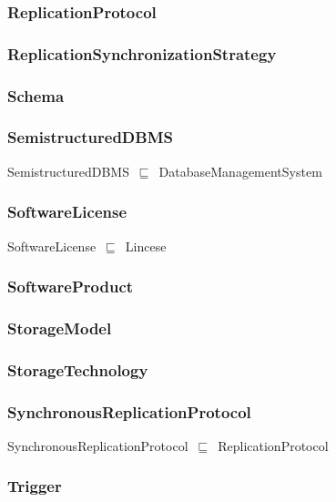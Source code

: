 \documentclass{article}
\begin{document}
\subsubsection*{ReplicationProtocol}

\subsubsection*{ReplicationSynchronizationStrategy}

\subsubsection*{Schema}

\subsubsection*{SemistructuredDBMS}

SemistructuredDBMS~\ensuremath{\sqsubseteq}~DatabaseManagementSystem~

\subsubsection*{SoftwareLicense}

SoftwareLicense~\ensuremath{\sqsubseteq}~Lincese~

\subsubsection*{SoftwareProduct}

\subsubsection*{StorageModel}

\subsubsection*{StorageTechnology}

\subsubsection*{SynchronousReplicationProtocol}

SynchronousReplicationProtocol~\ensuremath{\sqsubseteq}~ReplicationProtocol~

\subsubsection*{Trigger}
\end{document}
